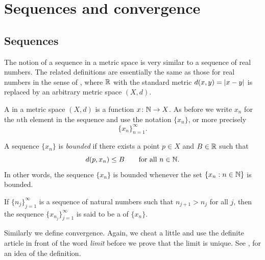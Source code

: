 \sectionnewpage
\section{Sequences and convergence}
\label{sec:metseqs}


\subsection{Sequences}

The notion of a sequence in a metric space is very similar to a sequence of
real numbers.
The related definitions are essentially the same as those for real numbers
in the sense of , where ${\mathbb{R}}$ with
the standard metric $d(x,y)=\left\lvert {x-y} \right\rvert$ is replaced
by an arbitrary metric space $(X,d)$.


\begin{defn}
A \emph{} in a metric space $(X,d)$ is a function
$x \colon {\mathbb{N}} \to X$.  As before we write $x_n$ for the $n$th element in
the sequence and use the notation $\{ x_n \}$, or more precisely
\begin{equation*}
\{ x_n \}_{n=1}^\infty .
\end{equation*}

A sequence $\{ x_n \}$ is \emph{bounded} if
there exists a point $p \in X$ and $B \in {\mathbb{R}}$ such that
\begin{equation*}
d(p,x_n) \leq B \qquad \text{for all } n \in {\mathbb{N}}.
\end{equation*}
In other words, the sequence $\{x_n\}$ is bounded whenever
the set $\{ x_n : n \in {\mathbb{N}} \}$
is bounded.

If $\{ n_j \}_{j=1}^\infty$ is a sequence of natural numbers
such that $n_{j+1} > n_j$ for all $j$, then
the sequence $\{ x_{n_j} \}_{j=1}^\infty$
is said to be
a \emph{} of $\{x_n \}$.
\end{defn}

Similarly we define convergence.  Again, we cheat a little
and use the definite article in front of the word \emph{limit}
before we prove that the limit is unique.
See , for an idea of
the definition.

